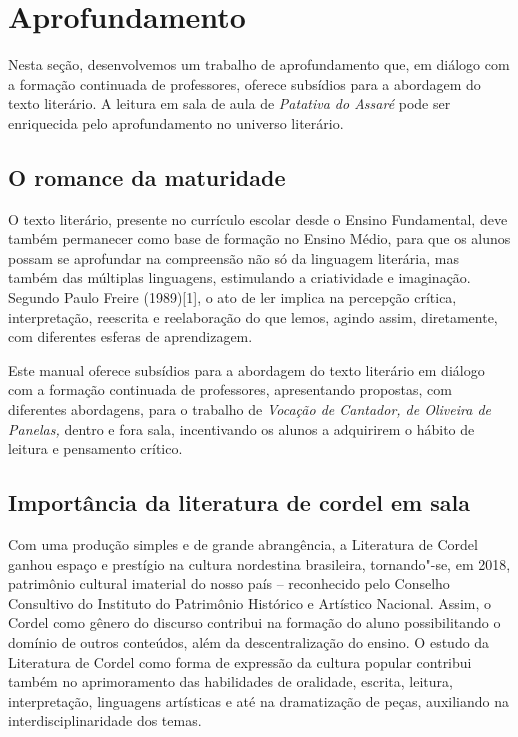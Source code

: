 \documentclass[12pt]{extarticle}
\begin{document}

\section{Aprofundamento}



Nesta seção, desenvolvemos um trabalho de aprofundamento que, em diálogo
com a formação continuada de professores, oferece subsídios para a
abordagem do texto literário. A leitura em sala de aula de
\emph{Patativa do Assaré} pode ser enriquecida pelo aprofundamento no
universo literário.

\subsection{O romance da maturidade}

O texto literário, presente no currículo escolar desde o Ensino
Fundamental, deve também permanecer como base de formação no Ensino
Médio, para que os alunos possam se aprofundar na compreensão não só da
linguagem literária, mas também das múltiplas linguagens, estimulando a
criatividade e imaginação. Segundo Paulo Freire (1989){[}1{]}, o ato de
ler implica na percepção crítica, interpretação, reescrita e
reelaboração do que lemos, agindo assim, diretamente, com diferentes
esferas de aprendizagem.

Este manual oferece subsídios para a abordagem do texto literário em
diálogo com a formação continuada de professores, apresentando
propostas, com diferentes abordagens, para o trabalho de \emph{Vocação
de Cantador, de Oliveira de Panelas,} dentro e fora sala, incentivando
os alunos a adquirirem o hábito de leitura e pensamento crítico.

\subsection{Importância da literatura de cordel em sala}

Com uma produção simples e de grande abrangência, a Literatura de Cordel
ganhou espaço e prestígio na cultura nordestina brasileira, tornando"-se,
em 2018, patrimônio cultural imaterial do nosso país -- reconhecido pelo
Conselho Consultivo do Instituto do Patrimônio Histórico e Artístico
Nacional. Assim, o Cordel como gênero do discurso contribui na formação
do aluno possibilitando o domínio de outros conteúdos, além da
descentralização do ensino. O estudo da Literatura de Cordel como forma
de expressão da cultura popular contribui também no aprimoramento das
habilidades de oralidade, escrita, leitura, interpretação, linguagens
artísticas e até na dramatização de peças, auxiliando na
interdisciplinaridade dos temas.
\end{document}
